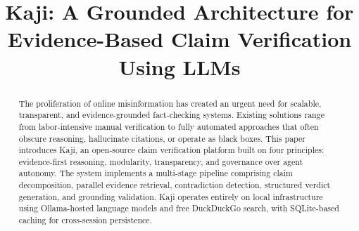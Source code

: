 \documentclass[conference]{IEEEtran}
\begin{document}
\title{Kaji: A Grounded Architecture for Evidence-Based Claim Verification Using LLMs}

\author{
  \and
  \and
  \and
}

\maketitle

\begin{abstract}
The proliferation of online misinformation has created an urgent need for scalable, transparent, and evidence-grounded fact-checking systems. Existing solutions range from labor-intensive manual verification to fully automated approaches that often obscure reasoning, hallucinate citations, or operate as black boxes. This paper introduces Kaji, an open-source claim verification platform built on four principles: evidence-first reasoning, modularity, transparency, and governance over agent autonomy. The system implements a multi-stage pipeline comprising claim decomposition, parallel evidence retrieval, contradiction detection, structured verdict generation, and grounding validation. Kaji operates entirely on local infrastructure using Ollama-hosted language models and free DuckDuckGo search, with SQLite-based caching for cross-session persistence.
\end{abstract}
\end{document}
